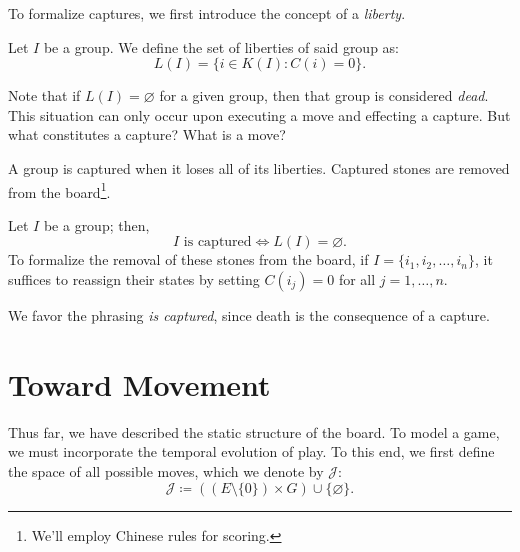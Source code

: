 To formalize captures, we first introduce the concept of a \textit{liberty}.

\begin{definition}
	Let \(I\) be a group. We define the set of liberties of said group as:
	$$L(I) = \{i \in K(I) : C(i) = 0\}.$$
	\end{definition}

Note that if $L(I) = \varnothing$ for a given group, then that group is considered \textit{dead}. This situation can only occur upon executing a move and effecting a capture. But what constitutes a capture? What is a move?

A group is captured when it loses all of its liberties. Captured stones are removed from the board\footnote{We'll employ Chinese rules for scoring.}.

\begin{definition}
	Let $I$ be a group; then,
	$$I \text{ is captured} \iff L(I) = \varnothing.$$
	To formalize the removal of these stones from the board, if \(I = \{i_1, i_2, \dots, i_n\}\), it suffices to reassign their states by setting \(C(i_j) = 0\) for all \(j=1, \dots, n\).
\end{definition}

We favor the phrasing \textit{is captured}, since death is the consequence of a capture.

\section{Toward Movement}

Thus far, we have described the static structure of the board. To model a game, we must incorporate the temporal evolution of play. To this end, we first define the space of all possible moves, which we denote by \(\mathcal{J}\):
$$\mathcal{J} \coloneqq \left((E \setminus \{0\}) \times G\right) \cup \{\varnothing\}.$$

